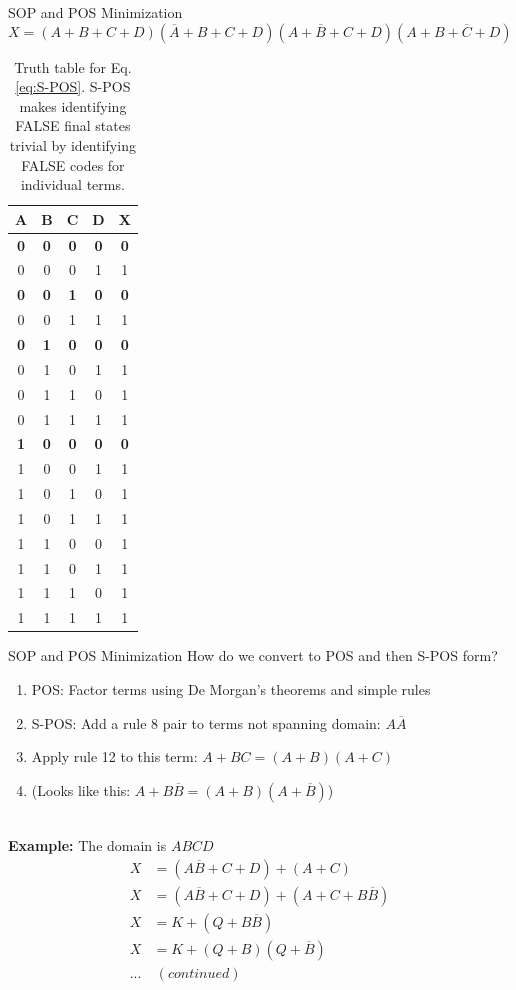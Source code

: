 \documentclass{beamer}
\begin{document}
\begin{frame}{SOP and POS Minimization}
\begin{equation}
X = (A+B+C+D)(\overline{A}+B+C+D)(A+\overline{B}+C+D)(A+B+\overline{C}+D) \label{eq:S-POS}
\end{equation}
\tiny
\begin{table}
\begin{tabular}{c c c c c}
\textbf{A} & \textbf{B} & \textbf{C} & \textbf{D} & \textbf{X} \\ \hline
\textbf{0} & \textbf{0} & \textbf{0} & \textbf{0} & \textbf{0} \\ \hline
0 & 0 & 0 & 1 & 1 \\ \hline
\textbf{0} & \textbf{0} & \textbf{1} & \textbf{0} & \textbf{0} \\ \hline
0 & 0 & 1 & 1 & 1 \\ \hline
\textbf{0} & \textbf{1} & \textbf{0} & \textbf{0} & \textbf{0} \\ \hline
0 & 1 & 0 & 1 & 1 \\
0 & 1 & 1 & 0 & 1 \\
0 & 1 & 1 & 1 & 1 \\ \hline
\textbf{1} & \textbf{0} & \textbf{0} & \textbf{0} & \textbf{0} \\ \hline
1 & 0 & 0 & 1 & 1 \\
1 & 0 & 1 & 0 & 1 \\
1 & 0 & 1 & 1 & 1 \\
1 & 1 & 0 & 0 & 1 \\
1 & 1 & 0 & 1 & 1 \\
1 & 1 & 1 & 0 & 1 \\
1 & 1 & 1 & 1 & 1 \\
\end{tabular}
\caption{\label{tab:TT2} Truth table for Eq. \ref{eq:S-POS}. S-POS makes identifying FALSE final states trivial by identifying FALSE codes for individual terms.}
\end{table}
\end{frame}

\begin{frame}{SOP and POS Minimization}
\small
How do we convert to POS and then S-POS form?
\begin{enumerate}
\item POS: Factor terms using De Morgan's theorems and simple rules
\item S-POS: Add a rule 8 pair to terms not spanning domain: $A\overline{A}$
\item Apply rule 12 to this term: $A+BC = (A+B)(A+C)$
\item (Looks like this: $A+B\overline{B} = (A+B)(A+\overline{B})$)
\end{enumerate} \hrulefill \\
\textbf{Example:} The domain is $ABCD$
\begin{align}
X &= (A\overline{B}+C+D)+(A+C) \\
X &= (A\overline{B}+C+D) + (A+C+B\overline{B}) \\
X &= K+(Q+B\overline{B}) \\
X &= K+(Q+B)(Q+\overline{B}) \\
... & ~ (continued)
\end{align}
\end{frame}
\end{document}

